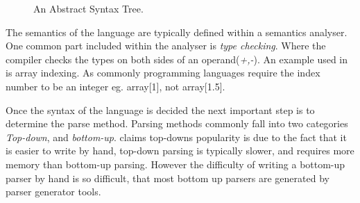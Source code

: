 \begin{figure}[ht!]
    \centering
    \caption{An Abstract Syntax Tree.}
    \label{fig:AST}
\end{figure}
\newpage
The semantics of the language are typically defined within a semantics analyser. One common part included within the analyser is \emph{type checking}. Where the compiler checks the types on both sides of an operand(\emph{+,-}). An example used in \citep{DragonBook} is array indexing. As commonly programming languages require the index number to be an integer eg. array[1], not array[1.5].

Once the syntax of the language is decided the next important step is to determine the parse method. Parsing methods commonly fall into two categories \emph{Top-down}, and \emph{bottom-up}. \citep{DragonBook} claims top-downs popularity is due to the fact that it is easier to write by hand, top-down parsing is typically slower, and requires more memory than bottom-up parsing. However the difficulty of writing a bottom-up parser by hand is so difficult, that most bottom up parsers are generated by parser generator tools.


